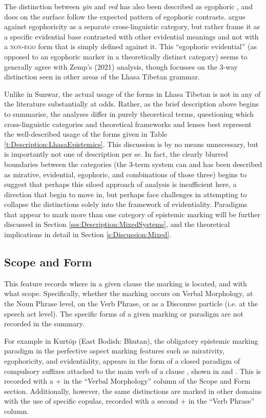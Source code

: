 The distinction between \textit{yin} and \textit{red} has also been described as egophoric \cite{EgoIntro}, and does on the surface follow the expected pattern of egophoric contrasts.  argue against egophoricity as a separate cross-linguistic category, but rather frame it as a specific evidential base contrasted with other evidential meanings and not with a \textsc{non-ego} form that is simply defined against it. This ``egophoric evidential'' (as opposed to an egophoric marker in a theoretically distinct category) seems to generally agree with Zemp's (2021) analysis, though focusses on the 3-way distinction seen in other areas of the Lhasa Tibetan grammar. 

Unlike in Sunwar, the actual usage of the forms in Lhasa Tibetan is not in any of the literature substantially at odds. Rather, as the brief description above begins to summarise, the analyses differ in purely theoretical terms, questioning which cross-linguistic categories and theoretical frameworks and lenses best represent the well-described usage of the forms given in Table \ref{t:Description:LhasaEpistemics}. This discussion is by no means unnecessary, but is importantly not one of description per se. In fact, the clearly blurred boundaries between the categories (the 3-term system can and has been described as mirative, evidential, egophoric, and combinations of those three) begins to suggest that perhaps this siloed approach of analysis is insufficient here, a direction that  begin to move in, but perhaps face challenges in attempting to collapse the distinctions solely into the framework of evidentiality. Paradigms that appear to mark more than one category of epistemic marking will be further discussed in Section \ref{sss:Description:MixedSystems}, and the theoretical implications in detail in Section \ref{s:Discussion:Mixed}.

\subsection{Scope and Form}
This feature records where in a given clause the marking is located, and with what scope. Specifically, whether the marking occurs on Verbal Morphology, at the Noun Phrase level, on the Verb Phrase, or as a Discourse particle (i.e. at the speech act level). The specific forms of a given marking or paradigm are not recorded in the summary.

For example in Kurtöp (East Bodish: Bhutan), the obligatory epistemic marking paradigm in the perfective aspect marking features such as mirativity, egophoricity, and evidentiality, appears in the form of a closed paradigm of compulsory suffixes attached to the main verb of a clause \cite{Hyslop2018}, shown in  and . This is recorded with a + in the ``Verbal Morphology'' column of the Scope and Form section. Additionally, however, the same distinctions are marked in other domains with the use of specific copulas, recorded with a second + in the ``Verb Phrase'' column.

